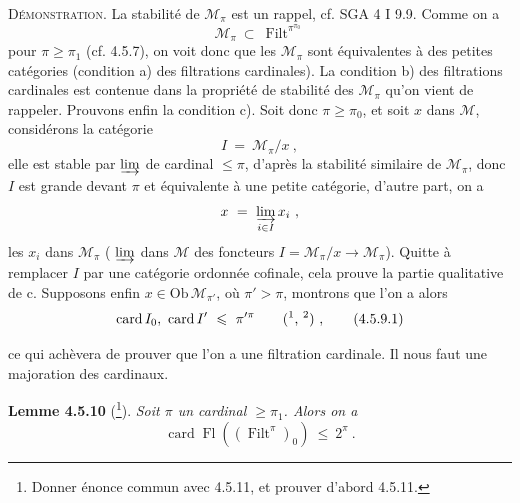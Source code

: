\documentclass[11pt]{article}
\newcommand{\msp}[1]{\marginpar{\footnotesize [#1]}}
\newcommand{\Ob}{\mathrm{Ob}\,}
\newcommand{\card}{\operatorname{card}}
\newcommand{\Fl}{\operatorname{Fl}}
\newcommand{\Filt}{\operatorname{Filt}}
\begin{document}
\textsc{Démonstration.} La stabilité de $\mathcal{M}_\pi$ est un rappel, cf. SGA 4 I 9.9. Comme on a
\[
\mathcal{M}_\pi \ \subset \ \Filt^{\pi^{\pi_0}}
\]
pour $\pi \geqslant \pi_1$ (cf. 4.5.7), on voit donc que les $\mathcal{M}_\pi$ sont équivalentes à des petites catégories (condition a) des filtrations cardinales). La condition b) des filtrations cardinales est contenue dans la propriété de stabilité des $\mathcal{M}_\pi$ qu'on vient de rappeler. Prouvons enfin la condition c). Soit donc $\pi \geqslant \pi_0$, et soit $x$ dans $\mathcal{M}$, considérons la catégorie
\[
I \ = \ \mathcal{M}_\pi/x \ ,
\]
elle est stable par $\varinjlim$ de cardinal $\leqslant \pi$, d'après la stabilité similaire de $\mathcal{M}_\pi$, donc $I$ est grande devant $\pi$ et équivalente à une petite catégorie, d'autre part, on a
\msp{page 122}
\[
x \ = \ \varinjlim_{i \in I} x_i \ ,
\]
les $x_i$ dans $\mathcal{M}_\pi$ ( $\varinjlim$ dans $\mathcal{M}$ des foncteurs $I = \mathcal{M}_\pi/x \longrightarrow \mathcal{M}_\pi$). Quitte à remplacer $I$ par une catégorie ordonnée cofinale, cela prouve la partie qualitative de c. Supposons enfin $x \in \Ob \mathcal{M}_{\pi'}$, où $\pi' > \pi$, montrons que l'on a alors
\[
\card I_0, \ \card I' \ \leqslant \ \pi'^{\pi} \qquad \text{(\footnotemark, \footnotemark)} \ , \tag*{(4.5.9.1)}
\]
\addtocounter{footnote}{-1}%
%
%
%
ce qui achèvera de prouver que l'on a une filtration cardinale. Il nous faut une majoration des cardinaux.

\textbf{Lemme 4.5.10} (\footnote{Donner énonce commun avec 4.5.11, et prouver d'abord 4.5.11.}). \textit{Soit $\pi$ un cardinal $\geqslant \pi_1$. Alors on a} %
\[
\card \Fl((\Filt^\pi)_0) \ \leqslant \ 2^\pi \ . \tag*{(4.5.10.1)}
\]
\end{document}
